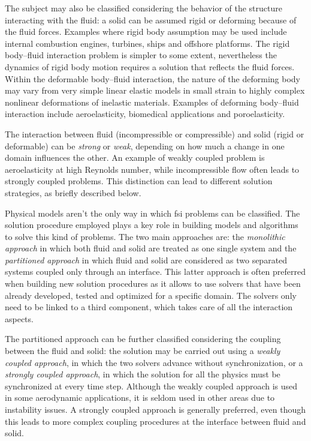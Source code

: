 The subject may also be classified considering the behavior of the structure interacting with the fluid: a solid can be assumed rigid or deforming because of the fluid forces. Examples where rigid body assumption may be used include internal combustion engines, turbines, ships and offshore platforms. The rigid body–fluid interaction problem is simpler to some extent, nevertheless the dynamics of rigid body motion requires a solution that reflects the fluid forces.
Within the deformable body–fluid interaction, the nature of the deforming body may vary from very simple linear elastic models in small strain to highly complex nonlinear deformations of inelastic materials.
Examples of deforming body–fluid interaction include aeroelasticity, biomedical applications and poroelasticity.

The interaction between fluid (incompressible or compressible) and solid (rigid or deformable) can be \textit{strong} or \textit{weak}, depending on how much a change in one domain influences the other. An example of weakly coupled problem is aeroelasticity at high Reynolds number, while incompressible flow often leads to strongly coupled problems. This distinction can lead to different solution strategies, as briefly described below. 

Physical models aren't the only way in which \acrshort{fsi} problems can be classified. The solution procedure employed plays a key role in building models and algorithms to solve this kind of problems. The two main approaches are: the \textit{monolithic approach} in which both fluid and solid are treated as one single system and the \textit{partitioned approach} in which fluid and solid are considered as two separated systems coupled only through an interface. This latter approach is often preferred when building new solution procedures as it allows to use solvers that have been already developed, tested and optimized for a specific domain. The solvers only need to be linked to a third component, which takes care of all the interaction aspects.

The partitioned approach can be further classified considering the coupling between the fluid and solid: the solution may be carried out using a \textit{weakly coupled approach}, in which the two solvers advance without synchronization, or a \textit{strongly coupled approach}, in which the solution for all the physics must be synchronized at every time step. Although the weakly coupled approach is used in some aerodynamic applications, it is seldom used in other areas due to instability issues. A strongly coupled approach is generally preferred, even though this leads to more complex coupling procedures at the interface between fluid and solid.

